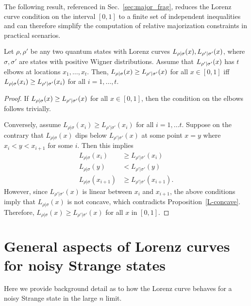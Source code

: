 \documentclass[pra,
aps,
twocolumn,
superscriptaddress,
groupedaddress,
nofootinbib,
reprint
]{revtex4-1}
\begin{document}
The following result, referenced in Sec.~\ref{sec:major_frag}, reduces the Lorenz curve condition on the interval $[0,1]$ to a finite set of independent inequalities and can therefore simplify the computation of relative majorization constraints in practical scenarios.
\begin{proposition}\label{thm:elbows}
	Let $\rho, \rho'$ be any two quantum states with Lorenz curves ${L_{\rho|\sigma}}(x), {L_{\rho'|\sigma'}}(x)$, where $\sigma, \sigma'$ are states with positive Wigner distributions. Assume that ${L_{\rho'|\sigma'}}(x)$ has $t$ elbows at locations $x_1, \dots, x_t$. Then, ${L_{\rho|\sigma}}(x) \geq {L_{\rho'|\sigma'}}(x)$ for all $x \in [0,1]$ iff ${L_{\rho|\sigma}}(x_{i}) \geq {L_{\rho'|\sigma'}}(x_{i})$ for all $i =1,\dots,t$.
\end{proposition}
\begin{proof}	
If ${L_{\rho|\sigma}}(x) \geq {L_{\rho'|\sigma'}}(x)$ for all $x \in [0,1]$, then the condition on the elbows follows trivially.

Conversely, assume $L_{\rho|\sigma}(x_i) \geq L_{\rho'|\sigma'}(x_i)$ for all $i=1,\dots t$. 
Suppose on the contrary that $L_{\rho|\sigma}(x)$ dips below $L_{\rho'|\sigma'}(x)$ at some point $x=y$ where $x_i < y < x_{i+1}$ for some $i$. Then this implies
\begin{align*}
L_{\rho|\sigma}(x_i) &\ge L_{\rho'|\sigma'}(x_i) \\
L_{\rho|\sigma}(y) & <L_{\rho'|\sigma'}(y) \\
L_{\rho|\sigma}(x_{i+1}) &\ge L_{\rho'|\sigma'}(x_{i+1}).
\end{align*}
However, since $L_{\rho'|\sigma'}(x)$ is linear between $x_i$ and $x_{i+1}$, the above conditions imply that $L_{\rho|\sigma}(x)$ is not concave, which contradicts Proposition~\ref{L-concave}.
Therefore, $L_{\rho|\sigma}(x) \geq L_{\rho'|\sigma'}(x)$ for all $x$ in $[0,1]$.
\end{proof}

\section{General aspects of Lorenz curves for noisy Strange states}
\label{app:lcsu_technical}

Here we provide background detail as to how the Lorenz curve behaves for a noisy Strange state in the large $n$ limit.
\end{document}

